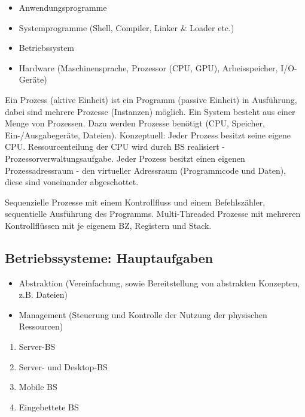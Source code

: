 \begin{itemize} 	\setlength\itemsep{0em}
	\item Anwendungsprogramme
	\item Systemprogramme (Shell, Compiler, Linker \& Loader etc.)
	\item Betriebssystem
	\item Hardware (Maschinensprache, Prozessor (CPU, GPU), Arbeisspeicher, I/O-Geräte)
\end{itemize}

Ein Prozess (aktive Einheit) ist ein Programm (passive Einheit) in Ausführung, dabei sind mehrere Prozesse (Instanzen) möglich. Ein System besteht aus einer Menge von Prozessen. Dazu werden Prozesse benötigt (CPU, Speicher, Ein-/Ausgabegeräte, Dateien). Konzeptuell: Jeder Prozess besitzt seine eigene CPU. Ressourcenteilung der CPU wird durch BS realisiert - Prozessorverwaltungsaufgabe. Jeder Prozess besitzt einen eigenen Prozessadressraum - den virtueller Adressraum (Programmcode und Daten), diese sind voneinander abgeschottet.  

Sequenzielle Prozesse mit einem Kontrollfluss und einem Befehlszähler, sequentielle Ausführung des Programms. Multi-Threaded Prozesse mit mehreren Kontrollflüssen mit je eigenem BZ, Registern und Stack. 

\subsection{Betriebssysteme: Hauptaufgaben}
\begin{itemize} \setlength\itemsep{0em}
	\item Abstraktion (Vereinfachung, sowie Bereitstellung von abstrakten Konzepten, z.B. Dateien)
	\item Management (Steuerung und Kontrolle der Nutzung der physischen Ressourcen)
\end{itemize}

\begin{enumerate} \setlength\itemsep{0em}
	\item Server-BS
	\item Server- und Desktop-BS
	\item Mobile BS
	\item Eingebettete BS
\end{enumerate}

